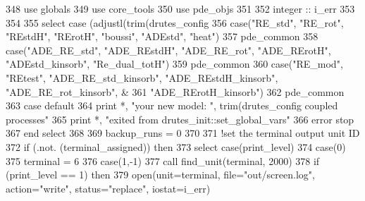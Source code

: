 \begin{DoxyCode}
348       \textcolor{keywordtype}{use }globals
349       \textcolor{keywordtype}{use }core_tools
350       \textcolor{keywordtype}{use }pde_objs
351 
352       \textcolor{keywordtype}{integer} :: i\_err
353       
354       
355       \textcolor{keywordflow}{select case} (adjustl(trim(drutes_config%
356         \textcolor{keywordflow}{case}(\textcolor{stringliteral}{"RE\_std"}, \textcolor{stringliteral}{"RE\_rot"}, \textcolor{stringliteral}{"REstdH"}, \textcolor{stringliteral}{"RErotH"}, \textcolor{stringliteral}{"boussi"}, \textcolor{stringliteral}{"ADEstd"}, \textcolor{stringliteral}{"heat"}\textcolor{comment}{)}
357 \textcolor{comment}{          pde_common%
358 \textcolor{comment}{        }\textcolor{keywordflow}{case}(\textcolor{stringliteral}{"ADE\_RE\_std"}, \textcolor{stringliteral}{"ADE\_REstdH"}, \textcolor{stringliteral}{"ADE\_RE\_rot"}, \textcolor{stringliteral}{"ADE\_RErotH"}, \textcolor{stringliteral}{"ADEstd\_kinsorb"}\textcolor{comment}{, }\textcolor{stringliteral}{"Re\_dual\_totH"}\textcolor{comment}{)}
359 \textcolor{comment}{          pde_common%
360 \textcolor{comment}{        }\textcolor{keywordflow}{case}(\textcolor{stringliteral}{"RE\_mod"}, \textcolor{stringliteral}{"REtest"}, \textcolor{stringliteral}{"ADE\_RE\_std\_kinsorb"}, \textcolor{stringliteral}{"ADE\_REstdH\_kinsorb"}, \textcolor{stringliteral}{"ADE\_RE\_rot\_kinsorb"}\textcolor{comment}{, &}
361 \textcolor{comment}{             }\textcolor{stringliteral}{"ADE\_RErotH\_kinsorb"})
362           pde_common%
363 \textcolor{keywordflow}{        case default}
364           print *, \textcolor{stringliteral}{"your new model: "}, trim(drutes_config%
       coupled processes"}
365           print *, \textcolor{stringliteral}{"exited from drutes\_init::set\_global\_vars"}
366           error stop
367 \textcolor{keywordflow}{      end select}
368 
369       backup_runs = 0
370 
371       \textcolor{comment}{!set the terminal output unit ID}
372       \textcolor{keywordflow}{if} (.not. (terminal_assigned)) \textcolor{keywordflow}{then}
373         \textcolor{keywordflow}{select case}(print_level)
374           \textcolor{keywordflow}{case}(0)
375             terminal = 6
376           \textcolor{keywordflow}{case}(1,-1)
377             \textcolor{keyword}{call }find_unit(terminal, 2000)
378             \textcolor{keywordflow}{if} (print_level == 1) \textcolor{keywordflow}{then}
379               \textcolor{keyword}{open}(unit=terminal, file=\textcolor{stringliteral}{"out/screen.log"}, action=\textcolor{stringliteral}{"write"}, status\textcolor{comment}{=}\textcolor{stringliteral}{"replace"}\textcolor{comment}{, iostat=i\_err)}
}
\end{DoxyCode}
